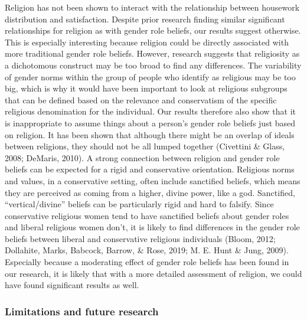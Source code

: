 \documentclass[
  man,floatsintext]{apa6}
\begin{document}
Religion has not been shown to interact with the relationship between housework distribution and satisfaction. Despite prior research finding similar significant relationships for religion as with gender role beliefs, our results suggest otherwise.
This is especially interesting because religion could be directly associated with more traditional gender role beliefs. However, research suggests that religiosity as a dichotomous construct may be too broad to find any differences. The variability of gender norms within the group of people who identify as religious may be too big, which is why it would have been important to look at religious subgroups that can be defined based on the relevance and conservatism of the specific religious denomination for the individual. Our results therefore also show that it is inappropriate to assume things about a person's gender role beliefs just based on religion. It has been shown that although there might be an overlap of ideals between religions, they should not be all lumped together (Civettini \& Glass, 2008; DeMaris, 2010).
A strong connection between religion and gender role beliefs can be expected for a rigid and conservative orientation. Religious norms and values, in a conservative setting, often include sanctified beliefs, which means they are perceived as coming from a higher, divine power, like a god. Sanctified, ``vertical/divine'' beliefs can be particularly rigid and hard to falsify. Since conservative religious women tend to have sanctified beliefs about gender roles and liberal religious women don't, it is likely to find differences in the gender role beliefs between liberal and conservative religious individuals (Bloom, 2012; Dollahite, Marks, Babcock, Barrow, \& Rose, 2019; M. E. Hunt \& Jung, 2009). Especially because a moderating effect of gender role beliefs has been found in our research, it is likely that with a more detailed assessment of religion, we could have found significant results as well.

\hypertarget{limitations-and-future-research}{%
\subsubsection{Limitations and future research}\label{limitations-and-future-research}}
\end{document}
